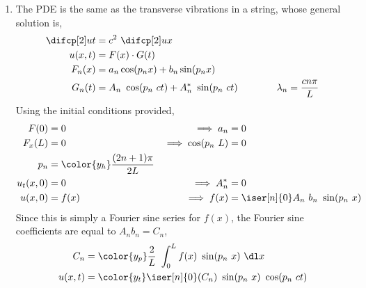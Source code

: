 \begin{enumerate}
    \item The PDE is the same as the transverse vibrations in a string, whose general
          solution is,
          \begin{align}
              \difcp[2] ut & = c^2\ \difcp[2] ux                 \\
              u(x, t)      & = F(x) \cdot G(t)                   \\
              F_n(x)       & = a_n \cos(p_n x) + b_n \sin(p_n x) \\
              G_n(t)       & = A_n\ \cos(p_n\ ct) +
              A_n^*\ \sin(p_n\ ct) \qquad\qquad \lambda_n = \frac{cn \pi}{L}
          \end{align}
          Using the initial conditions provided,
          \begin{align}
              F(0)                  & = 0                                  &
              \implies a_n          & = 0                                    \\
              F_x(L)                & = 0                                  &
              \implies \cos(p_n\ L) & = 0                                    \\
              p_n                   & = \color{y_h}\frac{(2n + 1)\pi}{2L}    \\
              u_t(x, 0)             & = 0                                  &
              \implies A_n^*        & = 0                                    \\
              u(x, 0)               & = f(x)                               &
              \implies f(x)         & = \iser[n]{0} A_n\ b_n\ \sin(p_n\ x)
          \end{align}
          Since this is simply a Fourier sine series for $ f(x) $, the Fourier sine
          coefficients are equal to $ A_n b_n = C_n $,
          \begin{align}
              C_n     & = \color{y_p}
              \frac{2}{L}\ \int_{0}^{L} f(x)\ \sin(p_n\ x)\ \dl x                    \\
              u(x, t) & = \color{y_t} \iser[n]{0} (C_n)\ \sin(p_n\ x)\ \cos(p_n\ ct)
          \end{align}


\end{enumerate}
